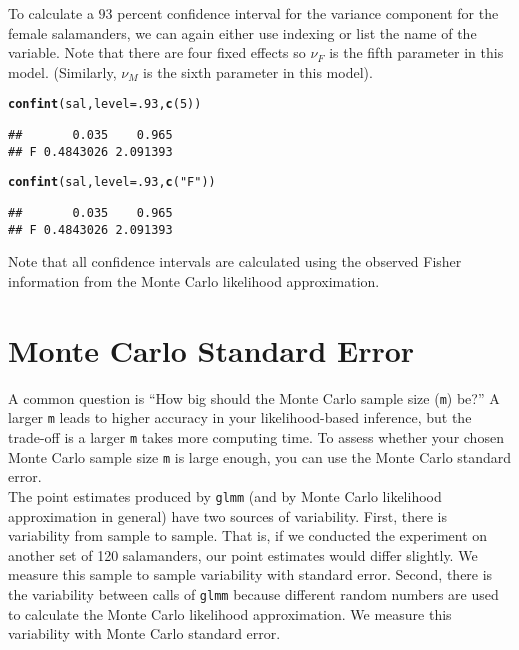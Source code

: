 \documentclass[11pt]{article}\usepackage[]{graphicx}\usepackage[]{color}
\makeatletter
\newcommand{\hlnum}[1]{\textcolor[rgb]{0.686,0.059,0.569}{#1}}%
\newcommand{\hlstr}[1]{\textcolor[rgb]{0.192,0.494,0.8}{#1}}%
\newcommand{\hlstd}[1]{\textcolor[rgb]{0.345,0.345,0.345}{#1}}%
\newcommand{\hlkwc}[1]{\textcolor[rgb]{0.333,0.667,0.333}{#1}}%
\newcommand{\hlkwd}[1]{\textcolor[rgb]{0.737,0.353,0.396}{\textbf{#1}}}%
\newenvironment{kframe}{%
 \def\at@end@of@kframe{}%
 \ifinner\ifhmode%
  \def\at@end@of@kframe{\end{minipage}}%
  \begin{minipage}{\columnwidth}%
 \fi\fi%
 \def\FrameCommand##1{\hskip\@totalleftmargin \hskip-\fboxsep
 \colorbox{shadecolor}{##1}\hskip-\fboxsep
     \hskip-\linewidth \hskip-\@totalleftmargin \hskip\columnwidth}%
 \MakeFramed {\advance\hsize-\width
   \@totalleftmargin\z@ \linewidth\hsize
   \@setminipage}}%
 {\par\unskip\endMakeFramed%
 \at@end@of@kframe}
\newenvironment{knitrout}{}{} %
\makeatother
\begin{document}
To calculate a $93$ percent confidence interval for the variance component for the female salamanders, we can again either use indexing or list the name of the variable. Note that there are four fixed effects so $\nu_F$ is the fifth parameter in this model. (Similarly, $\nu_M$ is the sixth parameter in this model).
\begin{knitrout}
\color{fgcolor}\begin{kframe}
\begin{alltt}
\hlkwd{confint}\hlstd{(sal,}\hlkwc{level}\hlstd{=}\hlnum{.93}\hlstd{,}\hlkwd{c}\hlstd{(}\hlnum{5}\hlstd{))}
\end{alltt}
\begin{verbatim}
##       0.035    0.965
## F 0.4843026 2.091393
\end{verbatim}
\begin{alltt}
\hlkwd{confint}\hlstd{(sal,}\hlkwc{level}\hlstd{=}\hlnum{.93}\hlstd{,}\hlkwd{c}\hlstd{(}\hlstr{"F"}\hlstd{))}
\end{alltt}
\begin{verbatim}
##       0.035    0.965
## F 0.4843026 2.091393
\end{verbatim}
\end{kframe}
\end{knitrout}

Note that all confidence intervals are calculated using the observed Fisher information from the Monte Carlo likelihood approximation.\\

\section{Monte Carlo Standard Error}
A common question is ``How big should the Monte Carlo sample size (\texttt{m}) be?'' A larger \texttt{m} leads to higher accuracy in your likelihood-based inference, but the trade-off is a larger \texttt{m} takes more computing time. To assess whether your chosen Monte Carlo sample size \texttt{m} is large enough, you can use the Monte Carlo standard error. \\

The point estimates produced by \texttt{glmm} (and by Monte Carlo likelihood approximation in general) have two sources of variability. First,  there is variability from sample to sample.  That is, if we conducted the experiment on another set of 120 salamanders, our point estimates would differ slightly. We measure this sample to sample variability with standard error. Second, there is the variability between calls of \texttt{glmm} because different random numbers are used to calculate the Monte Carlo likelihood approximation. We measure this variability with Monte Carlo standard error.\\
\end{document}
